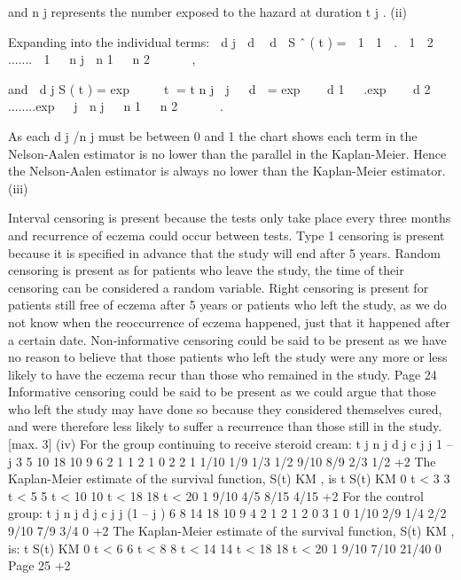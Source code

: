 \documentclass[a4paper,12pt]{article}
\begin{document}
and n j represents the number exposed to the hazard at duration t j .
(ii)


Expanding into the individual terms:
 d j
 d  d 
S ˆ ( t ) \;=\;  1  1  .  1  2  .......  1 
 n j
 n 1   n 2 


  ,


and

d j
S ( t ) \;=\; exp   
 t \;=\; t n j
 j

 d
 \;=\; exp    d 1   .exp    d 2   ........exp   j
 n j

 n 1 
 n 2 



 .



As each d j /n j must be between 0 and 1 the chart shows each term in the
Nelson-Aalen estimator is no lower than the parallel in the Kaplan-Meier. 
Hence the Nelson-Aalen estimator is always no lower than the
Kaplan-Meier estimator.
(iii)


Interval censoring is present because the tests only take place every three
months and recurrence of eczema could occur between tests.
Type 1 censoring is present because it is specified in advance that the study
will end after 5 years.
Random censoring is present as for patients who leave the study, the time of
their censoring can be considered a random variable.
Right censoring is present for patients still free of eczema after 5 years or
patients who left the study, as we do not know when the reoccurrence of
eczema happened, just that it happened after a certain date.
Non-informative censoring could be said to be present as we have no reason
to believe that those patients who left the study were any more or less likely to
have the eczema recur than those who remained in the study.
Page 24%
Informative censoring could be said to be present as we could argue that
those who left the study may have done so because they considered
themselves cured, and were therefore less likely to suffer a recurrence than
those still in the study.
[max. 3]
(iv)
For the group continuing to receive steroid cream:
t j n j d j c j \lambda j 1 – \lambda j
3
5
10
18 10
9
6
2 1
1
2
1 0
2
2
1 1/10
1/9
1/3
1/2 9/10
8/9
2/3
1/2
+2
The Kaplan-Meier estimate of the survival function, S(t) KM , is
t S(t) KM
0 \leq t < 3
3 \leq t < 5
5 \leq t < 10
10 \leq t < 18
18 \leq t < 20 1
9/10
4/5
8/15
4/15
+2
For the control group:
t j n j d j c j \lambda j (1 – \lambda j )
6
8
14
18 10
9
4
2 1
2
1
2 0
3
1
0 1/10
2/9
1/4
2/2 9/10
7/9
3/4
0
+2
The Kaplan-Meier estimate of the survival function, S(t) KM , is:
t S(t) KM
0 \leq t < 6
6 \leq t < 8
8 \leq t < 14
14 \leq t < 18
18 \leq t < 20 1
9/10
7/10
21/40
0
Page 25%
+2
\end{document}
